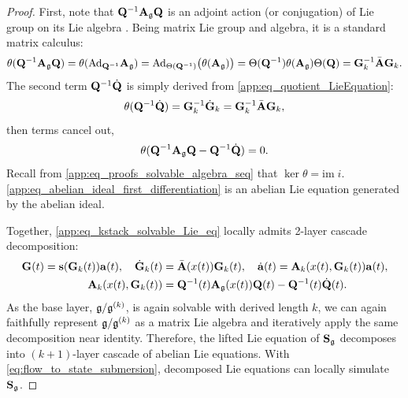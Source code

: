 \begin{proof}
    First, note that $\mathbf{Q}^{-1}\mathbf{A}_{\mathfrak{g}}\mathbf{Q}$ is an adjoint action (or conjugation) of Lie group on its Lie algebra
    \cite{robbin2022introduction}.
    Being matrix Lie group and algebra, it is a standard matrix calculus:
    \begin{equation*}
        \theta(\mathbf{Q}^{-1}\mathbf{A}_{\mathfrak{g}}\mathbf{Q})
        =
        \theta(\text{Ad}_{\mathbf{Q}^{-1}}\mathbf{A}_{\mathfrak{g}})
        =
        \text{Ad}_{\Theta(\mathbf{Q}^{-1})}\bigl(\theta(\mathbf{A}_{\mathfrak{g}})\bigr)
        =
        \Theta(\mathbf{Q}^{-1})\theta(\mathbf{A}_{\mathfrak{g}})\Theta(\mathbf{Q})
        =
        \mathbf{G}_k^{-1}\bar{\mathbf{A}}\mathbf{G}_k.
    \end{equation*}
    The second term $\mathbf{Q}^{-1}\dot{\mathbf{Q}}$ is simply derived from \cref{app:eq_quotient_LieEquation}:    
    \begin{equation*}
        \theta(\mathbf{Q}^{-1}\dot{\mathbf{Q}}) = \mathbf{G}_k^{-1}\dot{\mathbf{G}}_k = \mathbf{G}_k^{-1}\bar{\mathbf{A}}\mathbf{G}_k,
    \end{equation*}
    then terms cancel out,
    \begin{equation*}
        \theta(\mathbf{Q}^{-1}\mathbf{A}_{\mathfrak{g}}\mathbf{Q}-\mathbf{Q}^{-1}\dot{\mathbf{Q}}) = 0.
    \end{equation*}
    Recall from \cref{app:eq_proofs_solvable_algebra_seq} that $\ker \theta = \text{im} \; i$.
    \cref{app:eq_abelian_ideal_first_differentiation} is an abelian Lie equation generated by the abelian ideal.
    
    Together, \cref{app:eq_kstack_solvable_Lie_eq} locally admits 2-layer cascade decomposition:
    \begin{align*}
        \mathbf{G}(t) = \mathbf{s}(\mathbf{G}_k(t))\mathbf{a}(t),
        \quad
        \dot{\mathbf{G}}_k(t) &= \bar{\mathbf{A}}(x(t))\mathbf{G}_k(t),
        \quad
        \dot{\mathbf{a}}(t) = \mathbf{A}_k(x(t), \mathbf{G}_k(t))\mathbf{a}(t), \\
        \mathbf{A}_k(x(t), \mathbf{G}_k(t)) &= \mathbf{Q}^{-1}(t)\mathbf{A}_{\mathfrak{g}}(x(t))\mathbf{Q}(t)-\mathbf{Q}^{-1}(t)\dot{\mathbf{Q}}(t).
    \end{align*}
    As the base layer, $\mathfrak{g} / \mathfrak{g}^{(k)}$, is again solvable with derived length $k$,
    we can again faithfully represent $\mathfrak{g} / \mathfrak{g}^{(k)}$ as a matrix Lie algebra and iteratively apply the same decomposition near identity.
    Therefore, the lifted Lie equation of $\mathbf{S}_{\mathfrak{g}}$ decomposes into $(k+1)$-layer cascade of abelian Lie equations.
    With \cref{eq:flow_to_state_submersion}, decomposed Lie equations
    can locally simulate $\mathbf{S}_{\mathfrak{g}}$.


\end{proof}
